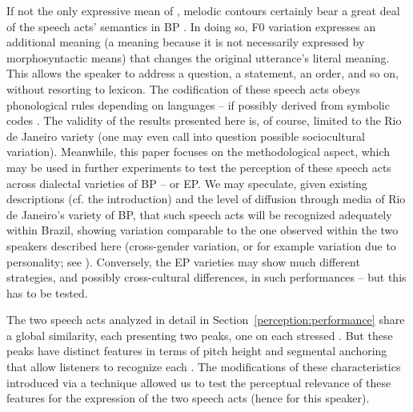 \documentclass[output=paper]{LSP/langsci}
\begin{document}
If not the only expressive mean of , melodic contours certainly bear a great deal of the  speech acts' semantics in BP \citep{moraes2014}. 
In doing so, F0 variation expresses an additional meaning (a  meaning because it is not necessarily expressed by morphosyntactic means) that changes the original utterance's literal meaning. 
This allows the speaker to address a question, a statement, an order, and so on, without resorting to lexicon. 
The codification of these  speech acts obeys phonological rules depending on languages -- if possibly derived from symbolic codes \citep{ohala1983,bolinger1986intonation}.
The validity of the results presented here is, of course, limited to the Rio de Janeiro variety (one may even call into question possible sociocultural variation).
Meanwhile, this paper focuses on the methodological aspect, which may be used in further experiments to test the perception of these speech acts across dialectal varieties of BP -- or EP. 
We may speculate, given existing descriptions (cf. the introduction) and the level of diffusion through media of Rio de Janeiro’s variety of BP, that such speech acts will be recognized adequately within Brazil, showing variation comparable to the one observed within the two speakers described here (cross-gender variation, or for example variation due to personality; see \citealt{rilliard2016}).
Conversely, the EP varieties may show much different strategies, and possibly cross-cultural differences, in such performances -- but this has to be tested.


The two speech acts analyzed in detail in Section~\ref{perception:performance} share a global similarity, each presenting two peaks, one on each stressed . 
But these peaks have distinct features in terms of pitch height and segmental anchoring that allow listeners to recognize each . 
The modifications of these characteristics introduced via a  technique allowed us to test the perceptual relevance of these features for the expression of the two speech acts (hence for this speaker).
\end{document}
